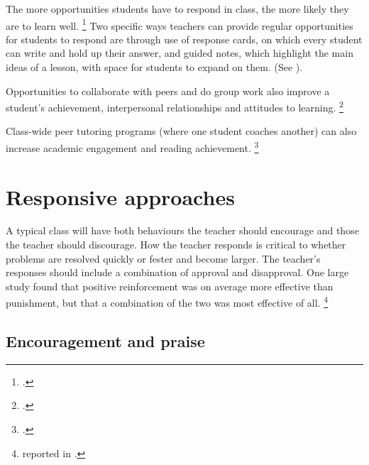 \documentclass{grattan}
\begin{document}
\citetrackerfalse

The more opportunities students have to respond in class, the more likely they are to learn well.%
    \footcite{Simonsen2008EvidenceBasedPractices}
Two specific ways teachers can provide regular opportunities for students to respond are through use of response cards, on which every student can write and hold up their answer, and guided notes, which highlight the main ideas of a lesson, with space for students to expand on them. (See ).

Opportunities to collaborate with peers and do group work also improve a student's achievement, interpersonal relationships and attitudes to learning.%
    \footcite{Marzano2003ClassroomManagementWorks}

Class-wide peer tutoring programs (where one student coaches another) can also increase academic engagement and reading achievement.%
    \footcite{Simonsen2008EvidenceBasedPractices}

\citetrackertrue

\section{Responsive approaches}\label{sec:responsive-approaches}
A typical class will have both behaviours the teacher should encourage and those the teacher should discourage. How the teacher responds is critical to whether problems are resolved quickly or fester and become larger.
The teacher's responses should include a combination of approval and disapproval. One large study found that positive reinforcement was on average more effective than punishment, but that a combination of the two was most effective of all.%
    \footnote{\textcite{Stage1997MetaanalysisInterventionsDecrease} reported in \textcite{Marzano2003ClassroomManagementWorks}.}

\subsection{Encouragement and praise}\label{subsec:encouragement-and-praise}
\end{document}

